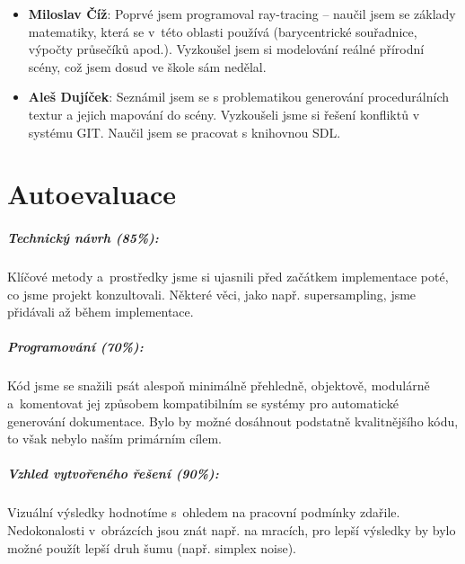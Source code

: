 \documentclass[12pt,a4paper,titlepage,final]{report}
\newcommand\AuthorA{Miloslav Číž}
\newcommand\AuthorB{Aleš Dujíček}
\begin{document}
\begin{itemize}
\item \textbf{\AuthorA}: Poprvé jsem programoval ray-tracing -- naučil
jsem se základy matematiky, která se v~této oblasti
používá (barycentrické souřadnice, výpočty průsečíků apod.). Vyzkoušel
jsem si modelování reálné přírodní scény, což jsem dosud ve škole sám
nedělal.
\item \textbf{\AuthorB}: Seznámil jsem se s problematikou generování
procedurálních textur a jejich mapování do scény. Vyzkoušeli jsme si
řešení konfliktů v systému GIT. Naučil jsem se pracovat s knihovnou SDL.
\end{itemize}


\chapter{Autoevaluace}

\paragraph{Technický návrh (85\%):}
Klíčové metody a~prostředky jsme si ujasnili před začátkem implementace
poté, co jsme projekt konzultovali. Některé věci, jako např.
supersampling, jsme přidávali až během implementace.

\paragraph{Programování (70\%):}
Kód jsme se snažili psát alespoň minimálně přehledně, objektově,
modulárně a~komentovat jej způsobem kompatibilním se systémy
pro automatické generování dokumentace. Bylo by možné
dosáhnout podstatně kvalitnějšího kódu, to však nebylo naším primárním
cílem.

\paragraph{Vzhled vytvořeného řešení (90\%):}
Vizuální výsledky hodnotíme s~ohledem na pracovní podmínky zdařile.
Nedokonalosti v~obrázcích jsou znát např. na mracích, pro lepší výsledky
by bylo možné použít lepší druh šumu (např. simplex noise).
\end{document}
